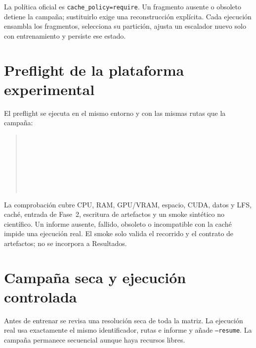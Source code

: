 La política oficial es \texttt{cache\_policy=require}. Un fragmento ausente o obsoleto detiene la campaña; sustituirlo exige una reconstrucción explícita. Cada ejecución ensambla los fragmentos, selecciona su partición, ajusta un escalador nuevo solo con entrenamiento y persiste ese estado.

\section{Preflight de la plataforma experimental}

El preflight se ejecuta en el mismo entorno y con las mismas rutas que la campaña:

\begin{quote}\small
{}\\
\hspace*{1em}\\
\hspace*{1em}\\
\hspace*{1em}\\
\hspace*{1em}\\
\hspace*{1em} \\
\hspace*{1em}
\end{quote}

La comprobación cubre CPU, RAM, GPU/VRAM, espacio, CUDA, datos y LFS, caché, entrada de Fase~2, escritura de artefactos y un smoke sintético no científico. Un informe ausente, fallido, obsoleto o incompatible con la caché impide una ejecución real. El smoke solo valida el recorrido y el contrato de artefactos; no se incorpora a Resultados.

\section{Campaña seca y ejecución controlada}

Antes de entrenar se revisa una resolución seca de toda la matriz. La ejecución real usa exactamente el mismo identificador, rutas e informe y añade \texttt{--resume}. La campaña permanece secuencial aunque haya recursos libres.

